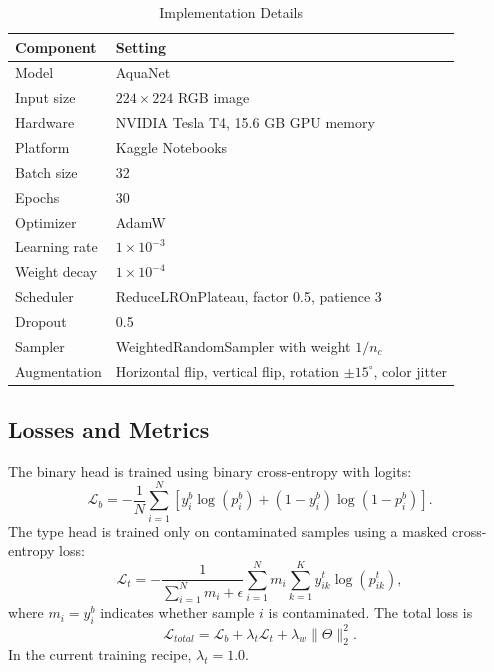 \documentclass[journal]{IEEEtran}
\newcommand{\method}{AquaNet}
\begin{document}
\begin{table}[!t]
\centering
\caption{Implementation Details}
\label{tab:implementation}
\begin{tabularx}{\linewidth}{lX}
\toprule
\textbf{Component} & \textbf{Setting} \\
\midrule
Model & \method{} \\
Input size & $224 \times 224$ RGB image \\
Hardware & NVIDIA Tesla T4, 15.6 GB GPU memory \\
Platform & Kaggle Notebooks \\
Batch size & 32 \\
Epochs & 30 \\
Optimizer & AdamW \\
Learning rate & $1 \times 10^{-3}$ \\
Weight decay & $1 \times 10^{-4}$ \\
Scheduler & ReduceLROnPlateau, factor 0.5, patience 3 \\
Dropout & 0.5 \\
Sampler & WeightedRandomSampler with weight $1/n_c$ \\
Augmentation & Horizontal flip, vertical flip, rotation $\pm 15^{\circ}$, color jitter \\
\bottomrule
\end{tabularx}
\end{table}

\subsection{Losses and Metrics}
\label{subsec:losses_metrics}
The binary head is trained using binary cross-entropy with logits:
\begin{equation}
\mathcal{L}_{b} = -\frac{1}{N}\sum_{i=1}^{N}\left[y_i^b \log(p_i^b) + (1-y_i^b)\log(1-p_i^b)\right].
\label{eq:binary_loss}
\end{equation}
The type head is trained only on contaminated samples using a masked cross-entropy loss:
\begin{equation}
\mathcal{L}_{t} = -\frac{1}{\sum_{i=1}^{N}m_i+\epsilon}\sum_{i=1}^{N}m_i\sum_{k=1}^{K} y_{ik}^{t}\log(p_{ik}^{t}),
\label{eq:type_loss}
\end{equation}
where $m_i=y_i^b$ indicates whether sample $i$ is contaminated. The total loss is
\begin{equation}
\mathcal{L}_{total} = \mathcal{L}_{b} + \lambda_t\mathcal{L}_{t} + \lambda_w\lVert\Theta\rVert_2^2.
\label{eq:total_loss}
\end{equation}
In the current training recipe, $\lambda_t=1.0$.
\end{document}

